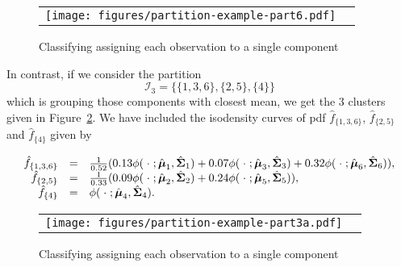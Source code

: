 \documentclass[10pt, a4paper]{article}
\newcommand{\m}[1]{\boldsymbol{#1}}
\begin{document}


\begin{figure}[!h]
\begin{center}
\begin{tabular}{cc}
  \texttt{[image: figures/partition-example-part6.pdf]} \\
 \end{tabular}
 \caption{Classifying assigning each observation to a single component}\label{ex_part6}
\end{center}
\end{figure}

In contrast, if we consider the partition
\[\mathcal{I}_3 = \{\{1, 3, 6\},\{2, 5\},\{4\}\}\]
which is grouping those components with closest mean, we get the 3 clusters given in Figure~\ref{ex_part3a}. We have included the isodensity curves of pdf $\hat{f}_{\{1,3,6\}}$, $\hat{f}_{\{2, 5\}}$ and $\hat{f}_{\{4\}}$ given by

\[ 
\begin{array}{r c l}
\hat{f}_{\{1,3,6\}} & = & \frac{1}{0.52}(0.13 \phi(\;\cdot\; ; \hat{\m\mu}_1, \hat{\m\Sigma}_1) + 0.07 \phi(\;\cdot\; ; \hat{\m\mu}_3, \hat{\m\Sigma}_3) + 0.32 \phi(\;\cdot\; ; \hat{\m\mu}_6, \hat{\m\Sigma}_6)), \\
\hat{f}_{\{2, 5\}} & = &  \frac{1}{0.33}(0.09 \phi(\;\cdot\; ; \hat{\m\mu}_2, \hat{\m\Sigma}_2) + 0.24 \phi(\;\cdot\; ; \hat{\m\mu}_5, \hat{\m\Sigma}_5)), \\
\hat{f}_{\{4\}} & = &\phi(\;\cdot\; ; \hat{\m\mu}_4, \hat{\m\Sigma}_4).
\end{array} 
\]
  


\begin{figure}[!h]
\begin{center}
\begin{tabular}{cc}
  \texttt{[image: figures/partition-example-part3a.pdf]} \\
 \end{tabular}
 \caption{Classifying assigning each observation to a single component}\label{ex_part3a}
\end{center}
\end{figure}
\end{document}
